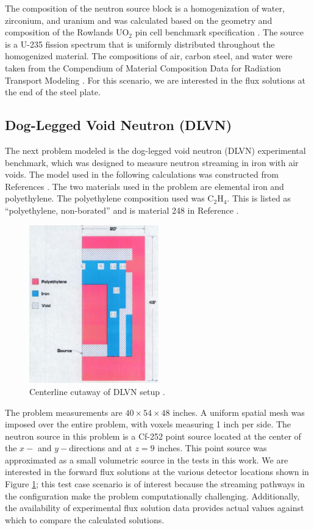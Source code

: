 \documentclass{article} %
\begin{document}
The composition of the neutron source block is a homogenization of water,
zirconium, and uranium and was calculated based on the geometry and
composition of the Rowlands UO$_2$ pin cell benchmark specification
\cite{pincell}. The source is a U-235 fission  spectrum that is uniformly
distributed throughout the homogenized material. The compositions of air,
carbon steel, and water were taken from the Compendium of  Material
Composition Data for Radiation Transport Modeling \cite{pnnl}. For this
scenario, we are interested in the flux solutions at the end of the steel plate.

\subsection{Dog-Legged Void Neutron (DLVN)}

The next problem modeled is the dog-legged void neutron (DLVN) experimental 
benchmark, which was designed to measure neutron streaming in iron with air
voids. The model used in the following calculations was constructed from
References \cite{sw-dlvn,j-dlvn,dlvn1991}. The two materials used in the
problem are elemental iron and polyethylene. The polyethylene composition used
was C$_2$H$_4$. This is listed as ``polyethylene, non-borated'' and is material
248 in Reference \cite{pnnl}. 

\begin{figure}[!htb]
\centering
\includegraphics[width=0.5\textwidth]{img/dlvn.png}
\caption{Centerline cutaway of DLVN setup \cite{sw-dlvn}.}
\label{dlvn}
\end{figure}

The problem measurements are $40\times54\times48$ inches. A uniform spatial
mesh was imposed over the entire problem, with voxels measuring 1 inch per
side. The neutron source in this problem is a Cf-252 point source located at
the center of the $x-$ and $y-$directions and at $z = 9$ inches. This point
source was approximated as a small volumetric source in the tests in this
work. We are interested in the forward flux solutions at the various detector
locations shown in Figure \ref{dlvn}; this test case scenario is of interest 
because the streaming pathways in the configuration make the problem computationally
challenging. Additionally, the availability of experimental flux solution data
provides actual values against which to compare the calculated solutions.
\end{document}
